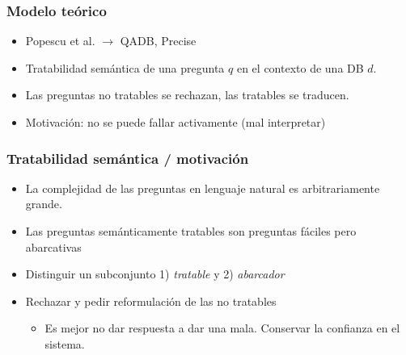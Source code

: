 \begin{frame}
  \frametitle{Modelo teórico}
      \begin{itemize}
          \item Popescu et al. $\rightarrow$ QADB, Precise
          \item Tratabilidad semántica de una pregunta $q$ en el contexto de una DB $d$.
          \item Las preguntas no tratables se rechazan, las tratables se traducen.
          \item Motivación: no se puede fallar activamente (mal interpretar)
      \end{itemize}
\end{frame}





\begin{frame}
  \frametitle{Tratabilidad semántica / motivación}
      \begin{itemize}
          \item La complejidad de las preguntas en lenguaje natural es arbitrariamente grande.
          \item Las preguntas semánticamente tratables son preguntas fáciles pero abarcativas
          \item Distinguir un subconjunto 1) \textit{tratable} y 2) \textit{abarcador}
          \item Rechazar y pedir reformulación de las no tratables
          \begin{itemize}
            \item Es mejor no dar respuesta a dar una mala. Conservar la confianza en el sistema.
          \end{itemize}
      \end{itemize}
\end{frame}

